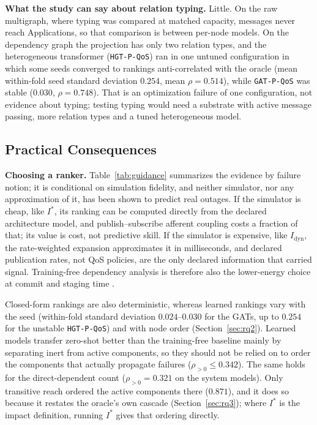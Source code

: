 \documentclass[preprint,3p]{elsarticle}
\begin{document}
\noindent\textbf{What the study can say about relation typing.} Little. On the raw multigraph, where typing was compared at matched capacity, messages never reach Applications, so that comparison is between per-node models. On the dependency graph the projection has only two relation types, and the heterogeneous transformer (\texttt{HGT-P-QoS}) ran in one untuned configuration in which some seeds converged to rankings anti-correlated with the oracle (mean within-fold seed standard deviation $0.254$, mean $\rho = 0.514$), while \texttt{GAT-P-QoS} was stable ($0.030$, $\rho = 0.748$). That is an optimization failure of one configuration, not evidence about typing; testing typing would need a substrate with active message passing, more relation types and a tuned heterogeneous model.

\subsection{Practical Consequences}
\label{sec:8.1}

\noindent\textbf{Choosing a ranker.} Table~\ref{tab:guidance} summarizes the evidence by failure notion; it is conditional on simulation fidelity, and neither simulator, nor any approximation of it, has been shown to predict real outages. If the simulator is cheap, like $I^*$, its ranking can be computed directly from the declared architecture model, and publish--subscribe afferent coupling \cite{martin2003agile,rud2006ais} costs a fraction of that; its value is cost, not predictive skill. If the simulator is expensive, like $I_{\text{dyn}}$, the rate-weighted expansion approximates it in milliseconds, and declared publication rates, not QoS policies, are the only declared information that carried signal. Training-free dependency analysis is therefore also the lower-energy choice at commit and staging time \cite{schwartz2020greenai,verdecchia2023greenai}.

Closed-form rankings are also deterministic, whereas learned rankings vary with the seed (within-fold standard deviation $0.024$--$0.030$ for the GATs, up to $0.254$ for the unstable \texttt{HGT-P-QoS}) and with node order (Section~\ref{sec:rq2}). Learned models transfer zero-shot better than the training-free baseline mainly by separating inert from active components, so they should not be relied on to order the components that actually propagate failures ($\rho_{>0} \le 0.342$). The same holds for the direct-dependent count ($\rho_{>0} = 0.321$ on the system models). Only transitive reach ordered the active components there ($0.871$), and it does so because it restates the oracle's own cascade (Section~\ref{sec:rq3}); where $I^*$ is the impact definition, running $I^*$ gives that ordering directly.
\end{document}
